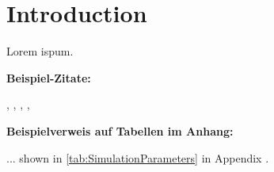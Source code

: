\chapter{Introduction} \label{Ch1_Introduction}

Lorem ispum.

\textbf{Beispiel-Zitate:}


\citep{Heger2014}, \citep{Riedmiller1999}, \citep{Russell2016}, \citep{Silver2018}, \citep{VDI3633Blatt12014}

\textbf{Beispielverweis auf Tabellen im Anhang:}

... shown in \autoref{tab:SimulationParameters} in Appendix . 